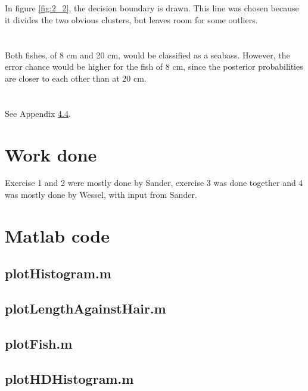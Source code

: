 \documentclass[10pt,a4paper]{article}
\begin{document}
\subsection{}
In figure \ref{fig:2_2}, the decision boundary is drawn. This line was chosen because it divides the two obvious clusters, but leaves room for some outliers.

\section{}
\subsection{}
\subsection{}
Both fishes, of 8 cm and 20 cm, would be classified as a seabass. However, the error chance would be higher for the fish of 8 cm, since the posterior probabilities are closer to each other than at 20 cm.

\section{}
\subsection{}
See Appendix \ref{a:plotHDHistogram}.
\subsection{}

\section{Work done}
Exercise 1 and 2 were mostly done by Sander, exercise 3 was done together and 4 was mostly done by Wessel, with input from Sander.

\appendix
\section{Matlab code}
\subsection{plotHistogram.m}\label{a:plotHistogram}

\subsection{plotLengthAgainstHair.m}\label{a:plotLengthAgainstHair}

\subsection{plotFish.m}\label{a:plotFish}

\subsection{plotHDHistogram.m}\label{a:plotHDHistogram}
\end{document}
